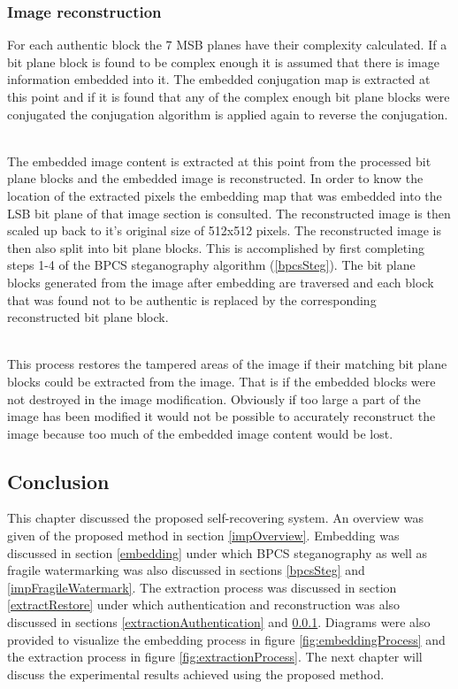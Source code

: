\documentclass[12pt]{article}
\begin{document}
\subsubsection{Image reconstruction}
\label{extractionReconstruction}
For each authentic block the 7 MSB planes have their complexity calculated.
If a bit plane block is found to be complex enough it is assumed that there is image information embedded into it.
The embedded conjugation map is extracted at this point and if it is found that any of the complex enough bit plane blocks were conjugated the conjugation algorithm is applied again to reverse the conjugation.

\hspace{0pt} \\
The embedded image content is extracted at this point from the processed bit plane blocks and the embedded image is reconstructed.
In order to know the location of the extracted pixels the embedding map that was embedded into the LSB bit plane of that image section is consulted.
The reconstructed image is then scaled up back to it's original size of 512x512 pixels.
The reconstructed image is then also split into bit plane blocks.
This is accomplished by first completing steps 1-4 of the BPCS steganography algorithm (\ref{bpcsSteg}).
The bit plane blocks generated from the image after embedding are traversed and each block that was found not to be authentic is replaced by the corresponding reconstructed bit plane block. 

\hspace{0pt} \\
This process restores the tampered areas of the image if their matching bit plane blocks could be extracted from the image. That is if the embedded blocks were not destroyed in the image modification. 
Obviously if too large a part of the image has been modified it would not be possible to accurately reconstruct the image because too much of the embedded image content would be lost.

\subsection{Conclusion}
This chapter discussed the proposed self-recovering system. An overview was given of the proposed method in section \ref{impOverview}. 
Embedding was discussed in section \ref{embedding} under which BPCS steganography as well as fragile watermarking was also discussed in sections \ref{bpcsSteg} and \ref{impFragileWatermark}.
The extraction process was discussed in section \ref{extractRestore} under which authentication and reconstruction was also discussed in sections \ref{extractionAuthentication} and \ref{extractionReconstruction}. 
Diagrams were also provided to visualize the embedding process in figure \ref{fig:embeddingProcess} and the extraction process in figure \ref{fig:extractionProcess}.
The next chapter will discuss the experimental results achieved using the proposed method.
\end{document}
